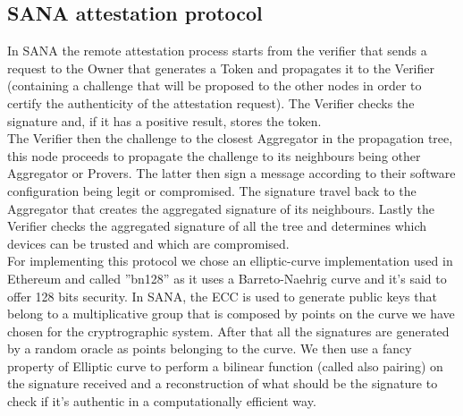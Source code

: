 \subsection{SANA attestation protocol}
In SANA the remote attestation process starts from the verifier that sends a request to the Owner that generates a Token and propagates it to the Verifier (containing a challenge that will be proposed to the other nodes in order to certify the authenticity of the attestation request). The Verifier checks the signature and, if it has a positive result, stores the token. \\The Verifier then
the challenge to the closest Aggregator in the propagation tree, this node proceeds to propagate the challenge to its neighbours being other Aggregator
or Provers. The latter then sign a message according to their software configuration being legit or compromised. The signature travel back to the Aggregator
that creates the aggregated signature of its neighbours. Lastly the Verifier checks the aggregated signature of all the tree and determines which devices
can be trusted and which are compromised.\\
For implementing this protocol we chose an elliptic-curve implementation used in Ethereum and called ''bn128'' as it uses a Barreto-Naehrig curve and it's said to offer 128 bits security.
In SANA, the ECC is used to generate public keys that belong to a multiplicative
group that is composed by points on the curve we have chosen for the cryptrographic system.
After that all the signatures are generated by a random oracle as points belonging to the curve. We then use a fancy property of Elliptic curve to perform a bilinear function (called also pairing) on the signature received and a reconstruction of what should be the signature to check if it's authentic in a computationally efficient way.